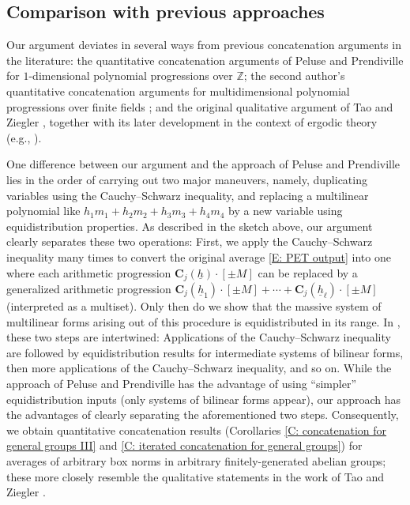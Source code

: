 \documentclass[11pt]{amsart}
\theoremstyle{definition}
\newcommand{\Z}{{\mathbb Z}}
\newcommand{\bc}{{\textbf{C}}}
\newcommand{\uh}{{\underline{h}}}
\begin{document}
\subsection{Comparison with previous approaches}


Our argument deviates in several ways from previous concatenation arguments in the literature: the quantitative concatenation arguments of Peluse and Prendiville \cite{Pel20, PP19, Pre20b} for $1$-dimensional polynomial progressions over $\Z$; the second author's quantitative concatenation arguments for multidimensional polynomial progressions over finite fields \cite{Kuc23}; and the original qualitative argument of Tao and Ziegler \cite{TZ16}, together with its later development in the context of ergodic theory (e.g., \cite{DFKS22}).


One difference between our argument and the approach of Peluse and Prendiville \cite{Pel20, PP19, Pre20b} lies in the order of carrying out two major maneuvers, namely, duplicating variables using the Cauchy--Schwarz inequality, and replacing a multilinear polynomial like $h_1 m_1 + h_2 m_2 + h_3 m_3 + h_4 m_4$ by a new variable using equidistribution properties. As described in the sketch above, our argument clearly separates these two operations: First, we apply the Cauchy--Schwarz inequality many times to convert the original average \eqref{E: PET output} into one where each arithmetic progression $\bc_j(\uh)\cdot[\pm M]$ can be replaced by a generalized arithmetic progression $\bc_j(\uh_1)\cdot[\pm M] + \cdots + \bc_j(\uh_\ell)\cdot[\pm M]$ (interpreted as a multiset). Only then do we show that the massive system of multilinear forms arising out of this procedure is equidistributed in its range. In \cite{Pel20, PP19, Pre20b}, these two steps are intertwined: Applications of the Cauchy--Schwarz inequality are followed by equidistribution results for intermediate systems of bilinear forms, then more applications of the Cauchy--Schwarz inequality, and so on.  While the approach of Peluse and Prendiville has the advantage of using ``simpler'' equidistribution inputs (only systems of bilinear forms appear), our approach has the advantages of clearly separating the aforementioned two steps.  Consequently, we obtain quantitative concatenation results (Corollaries \ref{C: concatenation for general groups III} and \ref{C: iterated concatenation for general groups}) for averages of arbitrary box norms in arbitrary finitely-generated abelian groups; these more closely resemble the qualitative statements in the work of  Tao and Ziegler \cite{TZ16}.
\end{document}
